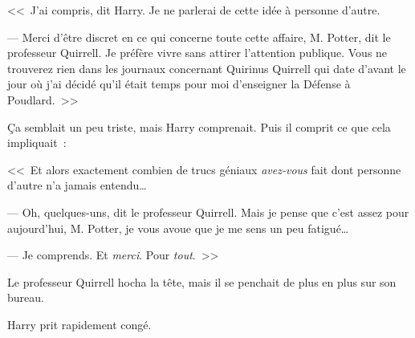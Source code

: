 <<~J'ai compris, dit Harry. Je ne parlerai de cette idée à personne d'autre.

--- Merci d'être discret en ce qui concerne toute cette affaire, M. Potter, dit le professeur Quirrell. Je préfère vivre sans attirer l'attention publique. Vous ne trouverez rien dans les journaux concernant Quirinus Quirrell qui date d'avant le jour où j'ai décidé qu'il était temps pour moi d'enseigner la Défense à Poudlard.~>>

Ça semblait un peu triste, mais Harry comprenait. Puis il comprit ce que cela impliquait~:

<<~Et alors exactement combien de trucs géniaux \emph{avez-vous} fait dont personne d'autre n'a jamais entendu…

--- Oh, quelques-uns, dit le professeur Quirrell. Mais je pense que c'est assez pour aujourd'hui, M. Potter, je vous avoue que je me sens un peu fatigué…

--- Je comprends. Et \emph{merci}. Pour \emph{tout}.~>>

Le professeur Quirrell hocha la tête, mais il se penchait de plus en plus sur son bureau.

Harry prit rapidement congé.~
